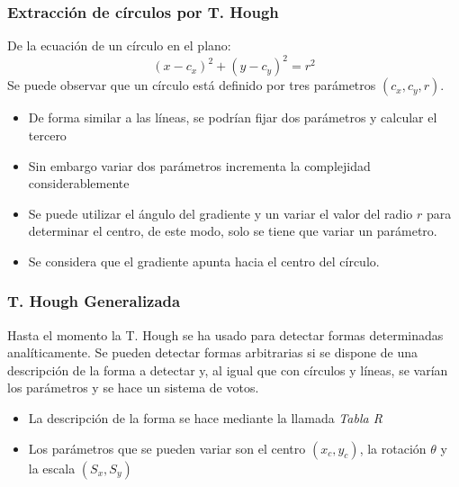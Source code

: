 \begin{frame}\frametitle{Extracción de círculos por T. Hough}
  De la ecuación de un círculo en el plano:
  \[(x - c_x)^2 + (y - c_y)^2 = r^2\]
  Se puede observar que un círculo está definido por tres parámetros $(c_x, c_y, r)$.
  \begin{itemize}
  \item De forma similar a las líneas, se podrían fijar dos parámetros y calcular el tercero
  \item Sin embargo variar dos parámetros incrementa la complejidad considerablemente
  \item Se puede utilizar el ángulo del gradiente y un variar el valor del radio $r$ para determinar el centro, de este modo, solo se tiene que variar un parámetro.
  \item Se considera que el gradiente apunta hacia el centro del círculo. 
  \end{itemize}
\end{frame}

\begin{frame}\frametitle{T. Hough Generalizada}
  Hasta el momento la T. Hough se ha usado para detectar formas determinadas analíticamente. Se pueden detectar formas arbitrarias si se dispone de una descripción de la forma a detectar y, al igual que con círculos y líneas, se varían los parámetros y se hace un sistema de votos.
  \begin{itemize}
  \item La descripción de la forma se hace mediante la llamada \textit{Tabla R}
  \item Los parámetros que se pueden variar son el centro $(x_c, y_c)$, la rotación $\theta$ y la escala $(S_x, S_y)$
  \end{itemize}
  
\end{frame}

